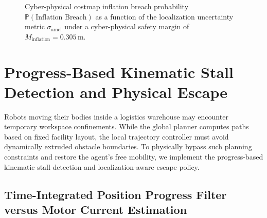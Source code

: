 \begin{figure}[htbp]
\centering
{}
\caption{Cyber-physical costmap inflation breach probability $\mathbb{P}(\text{Inflation Breach})$ as a function of the localization uncertainty metric $\sigma_{\text{amcl}}$ under a cyber-physical safety margin of $M_{\text{inflation}} = 0.305\,\text{m}$.}
\label{fig:cyber_physical_margin_plot}
\end{figure}

\section{Progress-Based Kinematic Stall Detection and Physical Escape}

Robots moving their bodies inside a logistics warehouse may encounter temporary work\-space confinements. While the global planner computes paths based on fixed facility layout, the local trajectory controller must avoid dynamically extruded obstacle boundaries. To physically bypass such planning constraints and restore the agent's free mobility, we implement the progress-based kinematic stall detection and localization-aware escape policy.

\subsection{Time-Integrated Position Progress Filter versus Motor Current Estimation}

